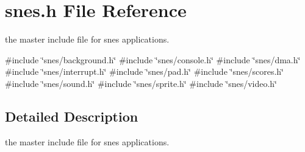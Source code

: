 \hypertarget{a00371}{}\section{snes.\+h File Reference}
\label{a00371}


the master include file for snes applications.  


{\ttfamily \#include \char`\"{}snes/background.\+h\char`\"{}}\newline
{\ttfamily \#include \char`\"{}snes/console.\+h\char`\"{}}\newline
{\ttfamily \#include \char`\"{}snes/dma.\+h\char`\"{}}\newline
{\ttfamily \#include \char`\"{}snes/interrupt.\+h\char`\"{}}\newline
{\ttfamily \#include \char`\"{}snes/pad.\+h\char`\"{}}\newline
{\ttfamily \#include \char`\"{}snes/scores.\+h\char`\"{}}\newline
{\ttfamily \#include \char`\"{}snes/sound.\+h\char`\"{}}\newline
{\ttfamily \#include \char`\"{}snes/sprite.\+h\char`\"{}}\newline
{\ttfamily \#include \char`\"{}snes/video.\+h\char`\"{}}\newline


\subsection{Detailed Description}
the master include file for snes applications. 

